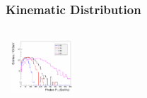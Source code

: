 \documentclass{beamer}
\begin{document}
\begin{frame}
\frametitle{Kinematic Distribution}
\begin{minipage}[t]{0.83\paperwidth}
  \begin{columns}
     \begin{column}{0.50\linewidth}
       \begin{tcolorbox}[colback=UNL@Cream!5,colframe=UNL@LightGrey!70,title=\textcolor{UMN@Maroon}{\textbf{Photon $p_{T}$ }}]
    \mbox{
           \includegraphics[height=2cm,width=\textwidth]{THESISPLOTS/GMSB_PhotPt.png}}
       \end{tcolorbox}    
     \end{column}
     \begin{column}{0.50\linewidth}
     \begin{tcolorbox}[colback=UNL@Cream!5,colframe=UNL@LightGrey!70,title=\textcolor{UMN@Maroon}{\textbf{Neutralino $c\tau$ }}]
     

\end{tcolorbox}
\end{column}
\end{columns}
\end{minipage}
\end{frame}
\end{document}
